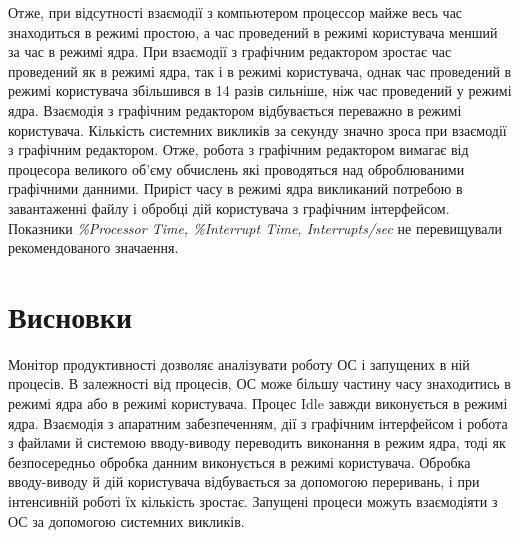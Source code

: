 \documentclass[12pt,a4paper]{article}
\begin{document}
Отже, при відсутності взаємодії з компьютером процессор майже весь час знаходиться в режимі простою, а час проведений в режимі користувача менший за час в режимі ядра. При взаємодії з графічним редактором зростає час проведений як в режимі ядра, так і в режимі користувача, однак час проведений в режимі користувача збільшився в 14 разів сильніше, ніж час проведений у режимі ядра. Взаємодія з графічним редактором відбувається переважно в режимі користувача. Кількість системних викликів за секунду значно зроса при взаємодії з графічним редактором. Отже, робота з графічним редактором вимагає від процесора великого об'єму обчислень які проводяться над оброблюваними графічними данними. Приріст часу в режимі ядра викликаний потребою в завантаженні файлу і обробці дій користувача з графічним інтерфейсом. Показники \textit{\%Processor Time, \%Interrupt Time, Interrupts/sec} не перевищували рекомендованого значаення.
\section*{Висновки}
Монітор продуктивності дозволяє аналізувати роботу ОС і запущених в ній процесів. В залежності від процесів, ОС може більшу частину часу знаходитись в режимі ядра або в режимі користувача. Процес Idle завжди виконується в режимі ядра. Взаємодія з апаратним забезпеченням, дії з графічним інтерфейсом і робота з файлами й системою вводу-виводу переводить виконання в режим ядра, тоді як безпосередньо обробка данним виконується в режимі користувача. Обробка вводу-виводу й дій користувача відбувається за допомогою переривань, і при інтенсивній роботі їх кількість зростає. Запущені процеси можуть взаємодіяти з ОС за допомогою системних викликів.
\end{document}
